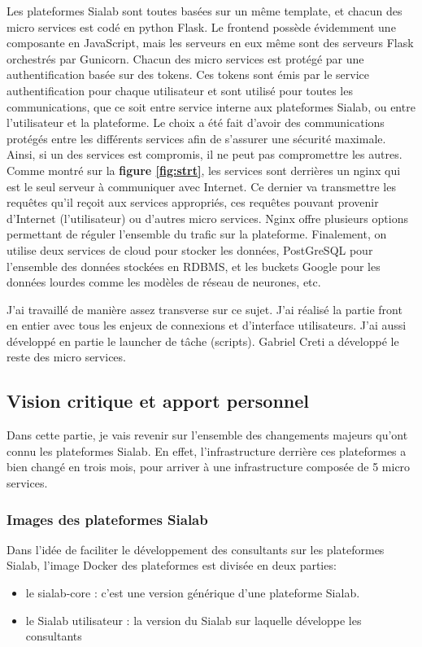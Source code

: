 \documentclass{article} %
\begin{document}
{Les plateformes Sialab sont toutes basées sur un même template, et chacun des micro services est codé en python Flask. Le frontend possède évidemment une composante en JavaScript, mais les serveurs en eux même sont des serveurs Flask orchestrés par Gunicorn. Chacun des micro services est protégé par une authentification basée sur des tokens. Ces tokens sont émis par le service authentification pour chaque utilisateur et sont utilisé pour toutes les communications, que ce soit entre service interne aux plateformes Sialab, ou entre l'utilisateur et la plateforme. Le choix a été fait d'avoir des communications protégés entre les différents services afin de s'assurer une sécurité maximale. Ainsi, si un des services est compromis, il ne peut pas compromettre les autres.\\

Comme montré sur la \textbf{figure \ref{fig:strt}}, les services sont derrières un nginx \cite{nginx} qui est le seul serveur à communiquer avec Internet. Ce dernier va transmettre les requêtes qu'il reçoit aux services appropriés, ces requêtes pouvant provenir d'Internet (l'utilisateur) ou d'autres micro services. Nginx offre plusieurs options permettant de réguler l'ensemble du trafic sur la plateforme. Finalement, on utilise deux services de cloud pour stocker les données, PostGreSQL pour l'ensemble des données stockées en RDBMS, et les buckets Google pour les données lourdes comme les modèles de réseau de neurones, etc. 

J'ai travaillé de manière assez transverse sur ce sujet. J'ai réalisé la partie front en entier avec tous les enjeux de connexions et d'interface utilisateurs. J'ai aussi développé en partie le launcher de tâche (scripts). Gabriel Creti a développé le reste des micro services.


\subsection{Vision critique et apport personnel}
Dans cette partie, je vais revenir sur l'ensemble des changements majeurs qu'ont connu les plateformes Sialab. En effet, l'infrastructure derrière ces plateformes a bien changé en trois mois, pour arriver à une infrastructure composée de 5 micro services.

\subsubsection{Images des plateformes Sialab}
Dans l'idée de faciliter le développement des consultants sur les plateformes Sialab, l'image Docker des plateformes est divisée en deux parties:
\begin{itemize}
 \item le sialab-core : c'est une version générique d'une plateforme Sialab.
 \item le Sialab utilisateur : la version du Sialab sur laquelle développe les consultants
\end{itemize}

}
\end{document}
